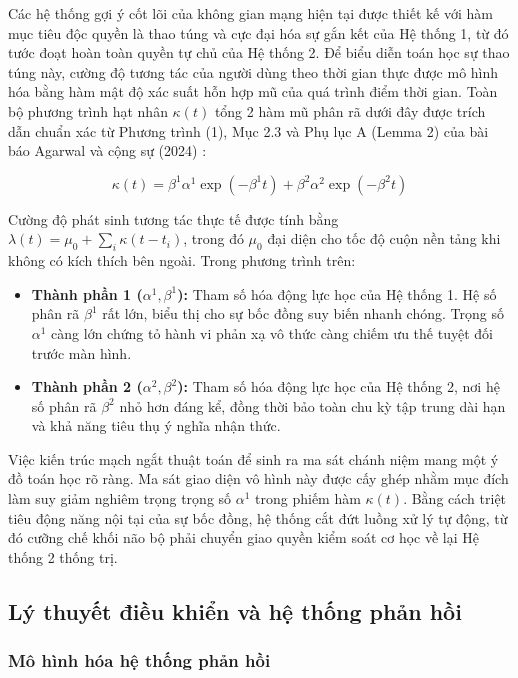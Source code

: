 Các hệ thống gợi ý cốt lõi của không gian mạng hiện tại được thiết kế với hàm mục tiêu độc quyền là thao túng và cực đại hóa sự gắn kết của Hệ thống 1, từ đó tước đoạt hoàn toàn quyền tự chủ của Hệ thống 2. Để biểu diễn toán học sự thao túng này, cường độ tương tác của người dùng theo thời gian thực được mô hình hóa bằng hàm mật độ xác suất hỗn hợp mũ của quá trình điểm thời gian. Toàn bộ phương trình hạt nhân $\kappa(t)$ tổng 2 hàm mũ phân rã dưới đây được trích dẫn chuẩn xác từ Phương trình (1), Mục 2.3 và Phụ lục A (Lemma 2) của bài báo Agarwal và cộng sự (2024) \cite{agarwal2024}:

\begin{equation}
    \kappa(t) = \beta^1\alpha^1\exp(-\beta^1t) + \beta^2\alpha^2\exp(-\beta^2t)
\end{equation}

Cường độ phát sinh tương tác thực tế được tính bằng $\lambda(t) = \mu_0 + \sum_i \kappa(t - t_i)$, trong đó $\mu_0$ đại diện cho tốc độ cuộn nền tảng khi không có kích thích bên ngoài. Trong phương trình trên:
\begin{itemize}
    \item \textbf{Thành phần 1 ($\alpha^1, \beta^1$):} Tham số hóa động lực học của Hệ thống 1. Hệ số phân rã $\beta^1$ rất lớn, biểu thị cho sự bốc đồng suy biến nhanh chóng. Trọng số $\alpha^1$ càng lớn chứng tỏ hành vi phản xạ vô thức càng chiếm ưu thế tuyệt đối trước màn hình.
    \item \textbf{Thành phần 2 ($\alpha^2, \beta^2$):} Tham số hóa động lực học của Hệ thống 2, nơi hệ số phân rã $\beta^2$ nhỏ hơn đáng kể, đồng thời bảo toàn chu kỳ tập trung dài hạn và khả năng tiêu thụ ý nghĩa nhận thức.
\end{itemize}

Việc kiến trúc mạch ngắt thuật toán để sinh ra ma sát chánh niệm mang một ý đồ toán học rõ ràng. Ma sát giao diện vô hình này được cấy ghép nhằm mục đích làm suy giảm nghiêm trọng trọng số $\alpha^1$ trong phiếm hàm $\kappa(t)$. Bằng cách triệt tiêu động năng nội tại của sự bốc đồng, hệ thống cắt đứt luồng xử lý tự động, từ đó cưỡng chế khối não bộ phải chuyển giao quyền kiểm soát cơ học về lại Hệ thống 2 thống trị.
\subsection{Lý thuyết điều khiển và hệ thống phản hồi}

\subsubsection{Mô hình hóa hệ thống phản hồi}

